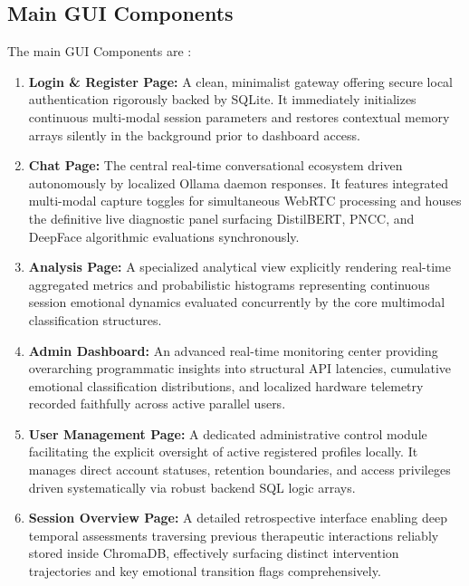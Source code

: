 \documentclass[11pt]{report}
\begin{document}
\subsection{Main GUI Components}
The main GUI Components are : 
\begin{enumerate}
    \item \textbf{Login \& Register Page:} A clean, minimalist gateway offering secure local authentication rigorously backed by SQLite. It immediately initializes continuous multi-modal session parameters and restores contextual memory arrays silently in the background prior to dashboard access.


    \item \textbf{Chat Page:} The central real-time conversational ecosystem driven autonomously by localized Ollama daemon responses. It features integrated multi-modal capture toggles for simultaneous WebRTC processing and houses the definitive live diagnostic panel surfacing DistilBERT, PNCC, and DeepFace algorithmic evaluations synchronously.


    \item \textbf{Analysis Page:} A specialized analytical view explicitly rendering real-time aggregated metrics and probabilistic histograms representing continuous session emotional dynamics evaluated concurrently by the core multimodal classification structures.


    \item \textbf{Admin Dashboard:} An advanced real-time monitoring center providing overarching programmatic insights into structural API latencies, cumulative emotional classification distributions, and localized hardware telemetry recorded faithfully across active parallel users.


    \item \textbf{User Management Page:} A dedicated administrative control module facilitating the explicit oversight of active registered profiles locally. It manages direct account statuses, retention boundaries, and access privileges driven systematically via robust backend SQL logic arrays.


    \item \textbf{Session Overview Page:} A detailed retrospective interface enabling deep temporal assessments traversing previous therapeutic interactions reliably stored inside ChromaDB, effectively surfacing distinct intervention trajectories and key emotional transition flags comprehensively.

\end{enumerate}
\end{document}
